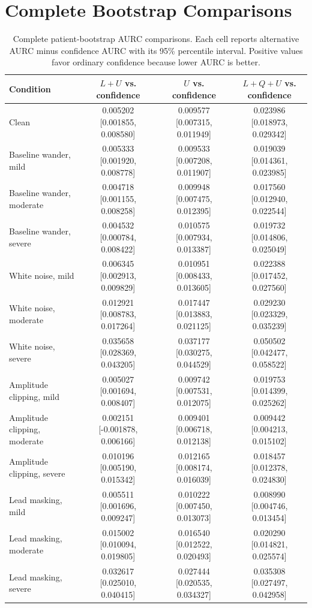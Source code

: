 \documentclass[journal]{IEEEtran}
\begin{document}
\section{Complete Bootstrap Comparisons}
\label{app:bootstrap}
\begin{table}[h]
\centering
\scriptsize
\caption{Complete patient-bootstrap AURC comparisons. Each cell reports alternative AURC minus confidence AURC with its 95\% percentile interval. Positive values favor ordinary confidence because lower AURC is better.}
\label{tab:all_bootstrap}
\begin{tabular}{lccc}
\toprule
Condition & $L+U$ vs. confidence & $U$ vs. confidence & $L+Q+U$ vs. confidence \\
\midrule
Clean & 0.005202 [0.001855, 0.008580] & 0.009577 [0.007315, 0.011949] & 0.023986 [0.018973, 0.029342] \\
Baseline wander, mild & 0.005333 [0.001920, 0.008778] & 0.009533 [0.007208, 0.011907] & 0.019039 [0.014361, 0.023985] \\
Baseline wander, moderate & 0.004718 [0.001155, 0.008258] & 0.009948 [0.007475, 0.012395] & 0.017560 [0.012940, 0.022544] \\
Baseline wander, severe & 0.004532 [0.000784, 0.008422] & 0.010575 [0.007934, 0.013387] & 0.019732 [0.014806, 0.025049] \\
White noise, mild & 0.006345 [0.002913, 0.009829] & 0.010951 [0.008433, 0.013605] & 0.022388 [0.017452, 0.027560] \\
White noise, moderate & 0.012921 [0.008783, 0.017264] & 0.017447 [0.013883, 0.021125] & 0.029230 [0.023329, 0.035239] \\
White noise, severe & 0.035658 [0.028369, 0.043205] & 0.037177 [0.030275, 0.044529] & 0.050502 [0.042477, 0.058522] \\
Amplitude clipping, mild & 0.005027 [0.001694, 0.008407] & 0.009742 [0.007531, 0.012075] & 0.019753 [0.014399, 0.025262] \\
Amplitude clipping, moderate & 0.002151 [-0.001878, 0.006166] & 0.009401 [0.006718, 0.012138] & 0.009442 [0.004213, 0.015102] \\
Amplitude clipping, severe & 0.010196 [0.005190, 0.015342] & 0.012165 [0.008174, 0.016039] & 0.018457 [0.012378, 0.024830] \\
Lead masking, mild & 0.005511 [0.001696, 0.009247] & 0.010222 [0.007450, 0.013073] & 0.008990 [0.004746, 0.013454] \\
Lead masking, moderate & 0.015002 [0.010094, 0.019805] & 0.016540 [0.012522, 0.020493] & 0.020290 [0.014821, 0.025574] \\
Lead masking, severe & 0.032617 [0.025010, 0.040415] & 0.027444 [0.020535, 0.034327] & 0.035308 [0.027497, 0.042958] \\
\bottomrule
\end{tabular}
\end{table}
\end{document}

